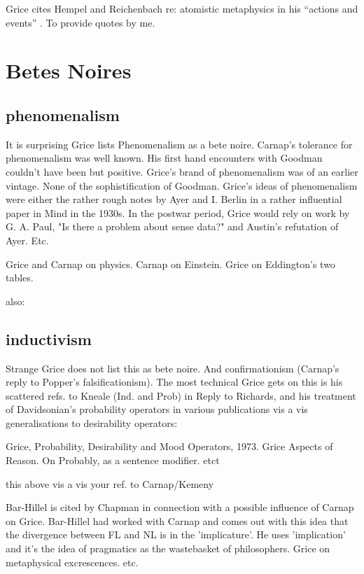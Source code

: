 \documentclass[10pt,titlepage]{book}
\begin{document}
Grice cites Hempel and Reichenbach re: atomistic metaphysics in his ``actions and events'' \cite{grice86}.
To provide quotes by me.
 
\section{Betes Noires}

\subsection{phenomenalism}

It is surprising Grice lists Phenomenalism as a bete noire. Carnap's  
tolerance for phenomenalism was well known. His first hand encounters with  
Goodman couldn't have been but positive. Grice's brand of phenomenalism was of  
an earlier vintage. None of the sophistification of Goodman. Grice's ideas of 
 phenomenalism were either the rather rough notes by Ayer and I. Berlin in 
a  rather influential paper in Mind in the 1930s. In the postwar period, 
Grice  would rely on work by G. A. Paul, "Is there a problem about sense data?" 
and  Austin's refutation of Ayer. Etc.

Grice and Carnap on physics. Carnap on Einstein. Grice on Eddington's two  
tables.
 
also:
 
\subsection{inductivism}

Strange Grice does not list this as bete noire. And  
confirmationism (Carnap's reply to Popper's falsificationism). The most  technical 
Grice gets on this is his scattered refs. to Kneale (Ind. and Prob) in  Reply 
to Richards, and his treatment of Davidsonian's probability operators in  
various publications vis a vis generalisations to desirability operators: 
 
Grice, Probability, Desirability and Mood Operators, 1973.
Grice Aspects of Reason. On Probably, as a sentence modifier. etct
 
this above vis a vis your ref. to Carnap/Kemeny
 
 
Bar-Hillel is cited by Chapman in connection with a possible influence of  
Carnap on Grice. Bar-Hillel had worked with Carnap and comes out with this 
idea  that the divergence between FL and NL is in the 'implicature'. He uses  
'implication' and it's the idea of pragmatics as the wastebasket of  
philosophers. Grice on metaphysical excrescences. etc. 
 
\end{document}
